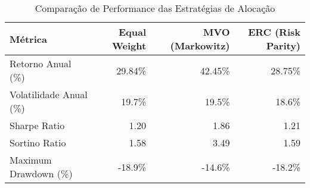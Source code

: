 
\begin{table}[!htbp]
\centering
\caption{Comparação de Performance das Estratégias de Alocação}
\label{tab:performance_principal}
\begin{tabular}{l*{3}{r}}
\toprule
\textbf{Métrica} & \textbf{Equal Weight} & \textbf{MVO (Markowitz)} & \textbf{ERC (Risk Parity)} \\
\midrule
Retorno Anual (\%) & 29.84\% & 42.45\% & 28.75\% \\
Volatilidade Anual (\%) & 19.7\% & 19.5\% & 18.6\% \\
Sharpe Ratio & 1.20 & 1.86 & 1.21 \\
Sortino Ratio & 1.58 & 3.49 & 1.59 \\
Maximum Drawdown (\%) & -18.9\% & -14.6\% & -18.2\% \\
\bottomrule
\end{tabular}
\end{table}
